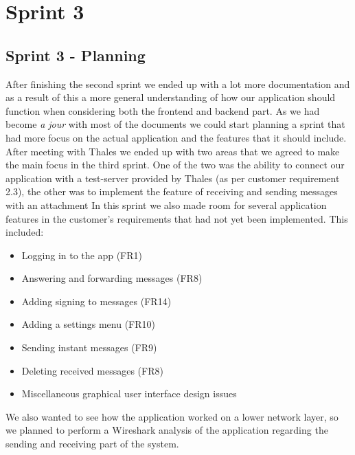 \chapter{Sprint 3}

\section{Sprint 3 - Planning}
After finishing the second sprint we ended up with a lot more documentation and as a result of this a more general understanding of how our application should function when considering both the frontend and backend part. As we had become \textit{a jour} with most of the documents we could start planning a sprint that had more focus on the actual application and the features that it should include. 
\newline
\newline
After meeting with Thales we ended up with two areas that we agreed to make the main focus in the third sprint. One of the two was the ability to connect our application with a test-server provided by Thales (as per customer requirement 2.3), the other was to implement the feature of receiving and sending messages with an attachment
\newline
\newline
In this sprint we also made room for several application features in the customer's requirements that had not yet been implemented. This included:
\begin{itemize}
\item{}Logging in to the app (FR1)
\item{}Answering and forwarding messages (FR8)
\item{}Adding signing to messages (FR14)
\item{}Adding a settings menu (FR10)
\item{}Sending instant messages (FR9)
\item{}Deleting received messages (FR8)
\item{}Miscellaneous graphical user interface design issues
\end{itemize}

We also wanted to see how the application worked on a lower network layer, so we planned to perform a Wireshark analysis of the application regarding the sending and receiving part of the system. 

\newpage

